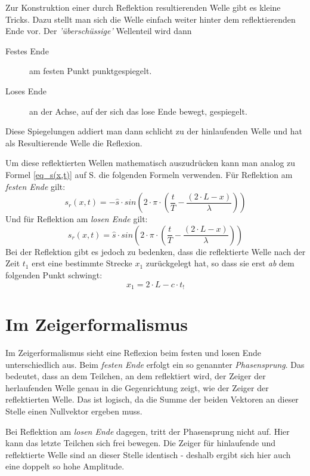Zur Konstruktion einer durch Reflektion resultierenden Welle gibt es kleine Tricks. Dazu stellt man sich die Welle einfach weiter hinter dem reflektierenden Ende vor. Der \textit{'überschüssige'} Wellenteil wird dann
\begin{description}
 \item[Festes Ende] am festen Punkt punktgespiegelt.
 \item[Loses Ende] an der Achse, auf der sich das lose Ende bewegt, gespiegelt.
 \end{description}
Diese Spiegelungen addiert man dann schlicht zu der hinlaufenden Welle und hat als Resultierende Welle die Reflexion.

Um diese reflektierten Wellen mathematisch auszudrücken kann man analog zu Formel \ref{eq_s(x,t)} auf S. \pageref{eq_s(x,t)} die folgenden Formeln verwenden. Für Reflektion am \emph{festen Ende} gilt:
\begin{equation}
 	s_r(x,t) = - \hat{s} \cdot sin\left(2 \cdot \pi \cdot \left(\frac{t}{T} - \frac{(2 \cdot L - x)}{\lambda}\right)\right)
\end{equation}
Und für Reflektion am \emph{losen Ende} gilt:
\begin{equation}
 	s_r(x,t) = \hat{s} \cdot sin\left(2 \cdot \pi \cdot \left(\frac{t}{T} - \frac{(2 \cdot L - x)}{\lambda}\right)\right)
\end{equation}
Bei der Reflektion gibt es jedoch zu bedenken, dass die reflektierte Welle nach der Zeit \(t_1\) erst eine bestimmte Strecke \(x_1\) zurückgelegt hat, so dass sie erst \emph{ab} dem folgenden Punkt schwingt:
\begin{equation}
 	x_1 = 2 \cdot L - c \cdot t_!
\end{equation}




				\section{Im Zeigerformalismus}

Im Zeigerformalismus sieht eine Reflexion beim festen und losen Ende unterschiedlich aus. Beim \emph{festen Ende} erfolgt ein so genannter \textit{Phasensprung}. Das bedeutet, dass an dem Teilchen, an dem reflektiert wird, der Zeiger der herlaufenden Welle genau in die Gegenrichtung zeigt, wie der Zeiger der reflektierten Welle. Das ist logisch, da die Summe der beiden Vektoren an dieser Stelle einen Nullvektor ergeben muss.

Bei Reflektion am \emph{losen Ende} dagegen, tritt der Phasensprung nicht auf. Hier kann das letzte Teilchen sich frei bewegen. Die Zeiger für hinlaufende und reflektierte Welle sind an dieser Stelle identisch - deshalb ergibt sich hier auch eine doppelt so hohe Amplitude.






